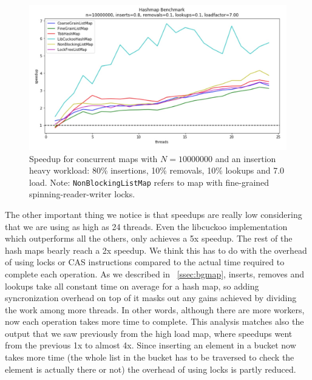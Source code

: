 \documentclass[11pt]{article}
\begin{document}
\begin{figure}[!htb]
\centering
\includegraphics[width=1.0\linewidth]{figs/patricio/latedays/inserts_heavy_highload.jpg}
\caption{
Speedup for concurrent maps with $N=10000000$ and an insertion heavy workload:
80\% insertions, 10\% removals, 10\% lookups and 7.0 load. Note:
{\tt NonBlockingListMap} refers to map with fine-grained spinning-reader-writer locks.}
\label{fig:mapInsertHeavyBigLoad}
\end{figure}

The other important thing we notice is that speedups are really low considering
that we are using as high as 24 threads. Even the libcuckoo implementation which
outperforms all the others, only achieves a 5x speedup. The rest of the hash
maps bearly reach a 2x speedup. We think this has to do with the overhead of
using locks or CAS instructions compared to the actual time required to complete
each operation. As we described in ~\ref{ssec:bgmap}, inserts, removes and
lookups take all constant time on average for a hash map, so adding
syncronization overhead on top of it masks out any gains achieved by dividing
the work among more threads. In other words, although there are more workers,
now each operation takes more time to complete. This analysis matches also the
output that we saw previously from the high load map, where speedups went from
the previous 1x to almost 4x. Since inserting an element in a bucket now takes more
time (the whole list in the bucket has to be traversed to check the element is
actually there or not) the overhead of using locks is partly reduced.
\end{document}
